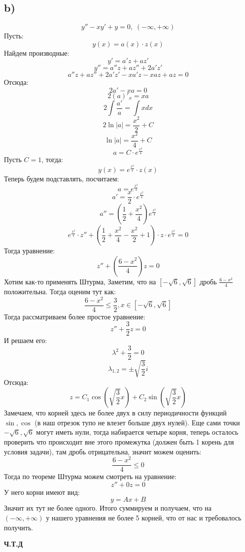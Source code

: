 \documentclass[a4paper,12pt]{article}
\begin{document}
\subsection*{b)}
\[
y'' - xy' + y = 0, \; (-\infty, + \infty) 
\]
Пусть:
\[
y(x) = a(x) \cdot z(x) 
\]
Найдем производные:
\[
y' = a' z + az' 
\]
\[
y'' = a'' z + az'' + 2a'z'
\]
\[
a'' z + az'' + 2a'z' -  xa'z  - xaz + az = 0
\]
Отсюда:
\[ 
2a' - xa = 0
\]
\[
2(a)'_x = xa
\]
\[
2 \int \frac{a'}{a} = \int x dx 
\]
\[
2 \ln |a| = \frac{x^2}{2}  + C
\]
\[
\ln |a| = \frac{x^2}{4} + C
\]
\[
a = C \cdot e^{\frac{x^2}{4}}
\]
Пусть $C = 1$, тогда:
\[
y(x) = e^{\frac{x^2}{4}} \cdot z(x)
\]
Теперь будем подставлять, посчитаем:
\[
a = e^{\frac{x^2}{4}}
\]
\[
a' = \frac{x}{2} \cdot e^{\frac{x^2}{4}}
\]
\[
a'' = \left(\frac{1}{2} + \frac{x^2}{4} \right) e^{\frac{x^2}{4}}
\]
\[
e^{\frac{x^2}{4}}  \cdot z'' + 
\left(
\frac12 + 
\frac{x^2}{4}
- \frac{x^2}{2}
+1
\right)
\cdot 
z \cdot 
e^{\frac{x^2}{4}}  = 0
\]
Тогда уравнение:
\[
z'' +  \left(
\frac{6 - x^2}{4 }
\right) z= 0
\]
Хотим как-то применять Штурма, Заметим, что на $[-\sqrt{6}, \sqrt{6}]$ дробь $\frac{6 - x^2}{4}$ положительна. Тогда оценим тут как:
\[
\frac{6 - x^2}{4} \leq \frac{3}{2},  x \in [-\sqrt{6}, \sqrt{6}]
\]
Тогда рассматриваем более простое уравнение:
\[
z'' + \frac32 z = 0
\]
И решаем его:
\[
\lambda^2 + \frac{3}{2} = 0 
\]
\[
\lambda_{1, 2} = \pm \sqrt{\frac{3}{2}}i
\]
Отсюда:
\[
z = C_1 \cos\left( \sqrt{\frac{3}{2}} x  \right)  + C_2 \sin \left( \sqrt{\frac{3}{2}} x  \right)
\]
Замечаем, что корней здесь не более двух в силу периодичности функций $\sin, \cos$ (в наш отрезок тупо не влезет больше двух нулей).  Еще сами точки $-\sqrt{6}, \sqrt{6}$ могут иметь нули, тогда набирается четыре корня, теперь осталось проверить что происходит вне этого промежутка (должен быть 1 корень для условия задачи), там дробь отрицательна, значит можем оценить:
\[
\frac{6 - x^2}{4} \leq 0
\]
Тогда по теореме Штурма можем смотреть на уравнение:
\[
z'' + 0 z = 0
\]
У него корни имеют вид:
\[
y = Ax + B
\]
Значит их тут не более одного. Итого суммируем и получаем, что на $(-\infty, +\infty)$ у нашего уравнения не более 5 корней, что от нас и требовалось получить.
\begin{center}
\textbf{Ч.Т.Д} 
\end{center}
\end{document}

